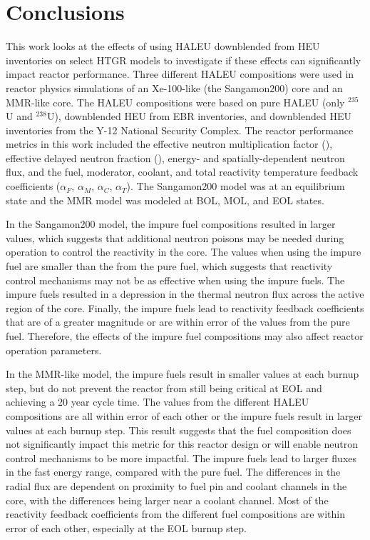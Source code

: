 \section{Conclusions}
This work looks at the effects of using 
\gls*{HALEU} downblended from \gls*{HEU} inventories on select 
\gls*{HTGR} models to investigate if these 
effects can significantly impact 
reactor performance. Three different \gls*{HALEU} 
compositions were used in reactor physics simulations of 
an Xe-100-like (the Sangamon200) core and an \gls*{MMR}-like 
core. The \gls*{HALEU} 
compositions were based on pure \gls*{HALEU} (only $^{235}$U and 
$^{238}$U), downblended \gls*{HEU} from \gls*{EBR} inventories, 
and downblended \gls*{HEU} inventories from the Y-12 National Security Complex. 
The reactor performance metrics in this work included
the effective neutron multiplication factor (\keff), 
effective delayed neutron fraction (\betaEff), energy- and 
spatially-dependent 
neutron flux, and the fuel, moderator, coolant, and total reactivity 
temperature feedback coefficients ($\alpha_F$, $\alpha_M$,
$\alpha_C$, $\alpha_T$). The Sangamon200 model was 
at an equilibrium state and the \gls*{MMR} model was modeled 
at \gls*{BOL}, \gls*{MOL}, and \gls*{EOL} states. 

In the Sangamon200 model, the impure fuel compositions resulted 
in larger \keff values, which suggests that additional neutron 
poisons may be needed during operation to control the reactivity 
in the core. The \betaEff values when using the impure fuel are 
smaller than the \betaEff from the pure fuel, which suggests that 
reactivity control mechanisms may not be as effective when using 
the impure fuels. The impure fuels resulted in a depression in the 
thermal neutron flux across the active region of the core.  Finally, the impure fuels 
lead to reactivity feedback coefficients that are of a greater magnitude 
or are within error of the values from the pure fuel.
Therefore, the effects of the impure fuel compositions 
may also affect reactor operation parameters. 

In the \gls*{MMR}-like model, the impure fuels result in smaller 
\keff values at each burnup step, but do not prevent the reactor 
from still being critical at \gls*{EOL} and achieving a 20 year 
cycle time. The \betaEff values from 
the different \gls*{HALEU} compositions are all within error 
of each other or the impure fuels result in larger 
\betaEff values at each burnup step. This result suggests that the fuel 
composition does not significantly impact this metric for this 
reactor design or will enable neutron control mechanisms to 
be more impactful. The impure fuels lead to larger fluxes in the 
fast energy range, compared with the pure fuel. The differences 
in the radial flux are dependent on proximity to fuel pin 
and coolant channels in the core, with the differences being 
larger near a coolant channel. 
Most of the reactivity feedback 
coefficients from the different fuel compositions are within 
error of each other, especially at the \gls*{EOL} burnup 
step. 


